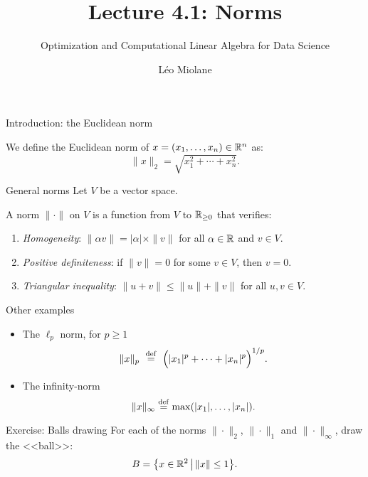\documentclass{beamer}
\title{Lecture 4.1: Norms}
\subtitle{Optimization and Computational Linear Algebra for Data Science}
\author{Léo Miolane}
\date{}
\begin{document}
\setcounter{showProgressBar}{0}
\setcounter{showSlideNumbers}{0}

\frame{\titlepage}

\setcounter{framenumber}{0}
\setcounter{showSlideNumbers}{1}

\begin{frame}[t]{Introduction: the Euclidean norm}
	\vspace{-0.4cm}
	\begin{definition}
		We define the Euclidean norm of $x=(x_1, \dots, x_n) \in \mathbb{R}^n$ as:
		$$
		\| x\|_2 = \sqrt{x_1^2 + \cdots + x_n^2}.
		$$
	\end{definition}
	\pause


\end{frame}

\begin{frame}[t]{General norms}
	Let $V$ be a vector space.
	\begin{definition}
		A norm $\| \cdot \|$ on $V$ is a function from $V$ to $\mathbb{R}_{\geq 0}$ that verifies:
		\vspace{0.1cm}
		\begin{enumerate}
			\item \emph{Homogeneity}: $\| \alpha v \| = |\alpha|\times \| v\|$ for all $\alpha \in \mathbb{R}$ and  $v \in V$.
				\vspace{0.1cm}
			\item \emph{Positive definiteness}: if $\|v\| = 0$ for some $v \in V$, then $v=0$.
				\vspace{0.1cm}
			\item \emph{Triangular inequality}: $\|u + v\| \leq \|u\| + \|v\|$ for all $u,v \in V$.
		\end{enumerate}
	\end{definition}
\end{frame}


\begin{frame}[t]{Other examples}
	\begin{itemize}
		\item The $\ell_p$ norm, for $p \geq 1$
			$$\|x\|_p \ \overset{\rm def}{=} \ \Big( |x_1|^p + \cdots + |x_n|^p \Big)^{1/p}.$$
		\item The infinity-norm 
			$$\|x \|_{\infty} \overset{\rm def}{=} \max(|x_1|, \dots, |x_n|).$$
	\end{itemize}
\end{frame}
\begin{frame}[t]{Exercise: Balls drawing}
	\vspace{-0.2cm}
	For each of the norms $\| \cdot \|_2$, $\| \cdot \|_1$ and $\| \cdot \|_{\infty}$, draw the <<ball>>:
	$$
	B = \big\{ x \in \mathbb{R}^2 \, \big| \, \|x\| \leq 1 \big\}.
	$$
	\pause
	\pause
\end{frame}
\end{document}
